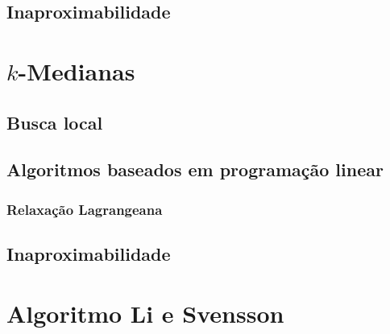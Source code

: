 \documentclass[12pt]{article}
\begin{document}
\subsection{Inaproximabilidade}
    
    
\section{$k$-Medianas}
    

\subsection{Busca local}
    
    
\subsection{Algoritmos baseados em programação linear}
    

\subsubsection{Relaxação Lagrangeana}
\label{k-median:RelLag}
    

\subsection{Inaproximabilidade}
    
\newpage
\section{Algoritmo Li e Svensson}
    
\newpage


\end{document}
